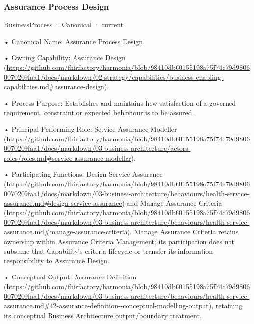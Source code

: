 \subsubsection{Assurance Process Design}

\label{element:aec3177dcdd84961814f2ba4f688ad33}
{\small BusinessProcess · Canonical · current}\par

•
Canonical Name: Assurance Process Design.



•
Owning Capability: Assurance Design (\url{https://github.com/fhirfactory/harmonia/blob/98410db60155198a75f74c79d98060070209faa1/docs/markdown/02-strategy/capabilities/business-enabling-capabilities.md#assurance-design}).



•
Process Purpose: Establishes and maintains how satisfaction of a governed requirement, constraint or expected behaviour is to be assured.



•
Principal Performing Role: Service Assurance Modeller (\url{https://github.com/fhirfactory/harmonia/blob/98410db60155198a75f74c79d98060070209faa1/docs/markdown/03-business-architecture/actors-roles/roles.md#service-assurance-modeller}).



•
Participating Functions: Design Service Assurance (\url{https://github.com/fhirfactory/harmonia/blob/98410db60155198a75f74c79d98060070209faa1/docs/markdown/03-business-architecture/behaviours/health-service-assurance.md#design-service-assurance}) and Manage Assurance Criteria (\url{https://github.com/fhirfactory/harmonia/blob/98410db60155198a75f74c79d98060070209faa1/docs/markdown/03-business-architecture/behaviours/health-service-assurance.md#manage-assurance-criteria}). Manage Assurance Criteria retains ownership within Assurance Criteria Management; its participation does not subsume that Capability's criteria lifecycle or transfer its information responsibility to Assurance Design.



•
Conceptual Output: Assurance Definition (\url{https://github.com/fhirfactory/harmonia/blob/98410db60155198a75f74c79d98060070209faa1/docs/markdown/03-business-architecture/behaviours/health-service-assurance.md#42-assurance-definition--conceptual-modelling-output}), retaining its conceptual Business Architecture output/boundary treatment.




